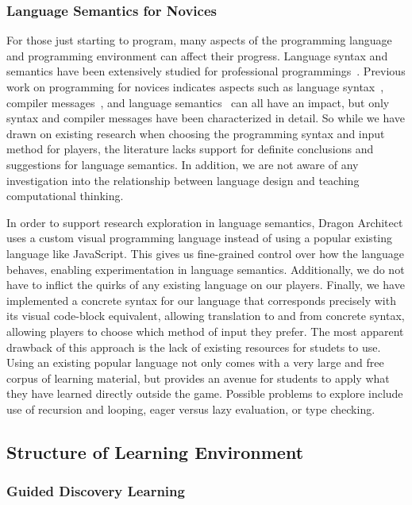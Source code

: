 \documentclass{sig-alternate}
\newcommand{\gametitle}{{Dragon Architect}}
\begin{document}
\subsubsection{Language Semantics for Novices}

For those just starting to program, many aspects of the programming language and programming environment can affect their progress. 
Language syntax and semantics have been extensively studied for professional programmings~\cite{hudak1994haskell, kennedy2004defining, delorey2007programming}.
Previous work on programming for novices indicates aspects such as language syntax~\cite{stefik2013syntax}, compiler messages~\cite{nienaltowski2008compiler}, and language semantics~\cite{hoc1990language} can all have an impact, but only syntax and compiler messages have been characterized in detail. 
So while we have drawn on existing research when choosing the programming syntax and input method for players, the literature lacks support for definite conclusions and suggestions for language semantics. 
In addition, we are not aware of any investigation into the relationship between language design and teaching computational thinking.

In order to support research exploration in language semantics, \gametitle{} uses a custom visual programming language instead of using a popular existing language like JavaScript. 
This gives us fine-grained control over how the language behaves, enabling experimentation in language semantics.
Additionally, we do not have to inflict the quirks of any existing language on our players. 
Finally, we have implemented a concrete syntax for our language that corresponds precisely with its visual code-block equivalent, allowing translation to and from concrete syntax, allowing players to choose which method of input they prefer.  
The most apparent drawback of this approach is the lack of existing resources for studets to use.
Using an existing popular language not only comes with a very large and free corpus of learning material, but provides an avenue for students to apply what they have learned directly outside the game.
Possible problems to explore include use of recursion and looping, eager versus lazy evaluation, or type checking.

\subsection{Structure of Learning Environment}

\subsubsection{Guided Discovery Learning}
\label{sec:guided_discovery_theory}
\end{document}
